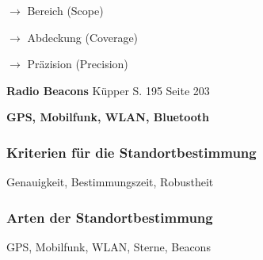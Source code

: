 $\longrightarrow$ Bereich (Scope) 

$\longrightarrow$ Abdeckung (Coverage)

$\longrightarrow$ Präzision (Precision) 

\textbf{Radio Beacons}
Küpper S. 195
Seite 203


\textbf{GPS, Mobilfunk, WLAN, Bluetooth}

\subsubsection{Kriterien für die Standortbestimmung}
Genauigkeit, Bestimmungszeit, Robustheit


\subsubsection{Arten der Standortbestimmung}
GPS, Mobilfunk, WLAN, Sterne, Beacons